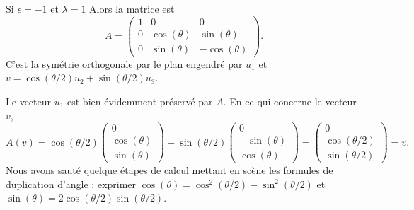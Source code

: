 \begin{subproof}
    \item[Si \( \epsilon=-1\) et \( \lambda=1\)] Alors la matrice est
        \begin{equation}
            A=\begin{pmatrix}
                1    &   0    &   0    \\
                0    &   \cos(\theta)    &   \sin(\theta)    \\
                0    &   \sin(\theta)    &   -\cos(\theta)
            \end{pmatrix}.
        \end{equation}
        C'est la symétrie orthogonale par le plan engendré par \( u_1\) et \( v=\cos(\theta/2)u_2+\sin(\theta/2)u_3\).

        Le vecteur \( u_1\) est bien évidemment préservé par \( A\). En ce qui concerne le vecteur \( v\),
        \begin{equation}
            A(v)=\cos(\theta/2)\begin{pmatrix}
                0    \\ 
                \cos(\theta)    \\ 
                \sin(\theta)    
            \end{pmatrix}+\sin(\theta/2)\begin{pmatrix}
                0    \\ 
                -\sin(\theta)    \\ 
                \cos(\theta)    
            \end{pmatrix}=
            \begin{pmatrix}
                0    \\ 
                \cos(\theta/2)    \\ 
                \sin(\theta/2)    
            \end{pmatrix}=v.
        \end{equation}
        Nous avons sauté quelque étapes de calcul mettant en scène les formules de duplication d'angle : exprimer \( \cos(\theta)=\cos^2(\theta/2)-\sin^2(\theta/2)\) et \( \sin(\theta)=2\cos(\theta/2)\sin(\theta/2)\).


\end{subproof}
